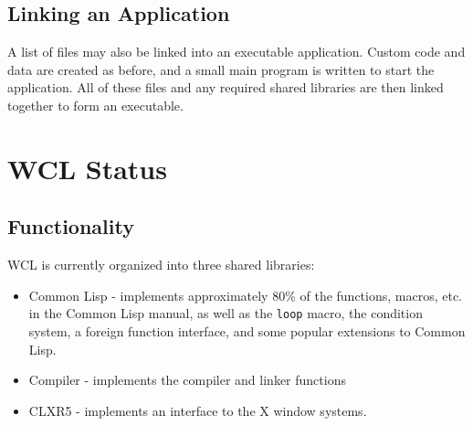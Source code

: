 \subsection{Linking an Application}

A list of files may also be linked into an executable application.
Custom code and data are created as before, and a small main program is
written to start the application. All of these files and any required
shared libraries are then linked together to form an executable.

\section{WCL Status}



\subsection{Functionality}

WCL is currently organized into three shared libraries: 

\begin{itemize}
\item Common Lisp - implements approximately 80\% of the functions, macros,
etc. in the Common Lisp manual, as well as the {\tt loop} macro, the
condition system, a foreign function interface, and some popular
extensions to Common Lisp. 

\item Compiler - implements the compiler and linker functions

\item CLXR5 - implements an interface to the X window systems.
\end{itemize}

